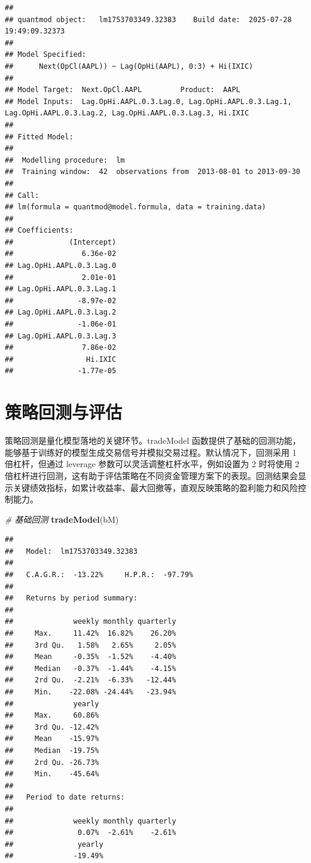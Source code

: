 \documentclass[]{ctexbook}
\newenvironment{Shaded}{\begin{snugshade}}{\end{snugshade}}
\newcommand{\CommentTok}[1]{\textcolor[rgb]{0.56,0.35,0.01}{\textit{#1}}}
\newcommand{\FunctionTok}[1]{\textcolor[rgb]{0.13,0.29,0.53}{\textbf{#1}}}
\newcommand{\NormalTok}[1]{#1}
\begin{document}
\begin{verbatim}
## 
## quantmod object:   lm1753703349.32383    Build date:  2025-07-28 19:49:09.32373 
## 
## Model Specified: 
##      Next(OpCl(AAPL)) ~ Lag(OpHi(AAPL), 0:3) + Hi(IXIC) 
## 
## Model Target:  Next.OpCl.AAPL         Product:  AAPL 
## Model Inputs:  Lag.OpHi.AAPL.0.3.Lag.0, Lag.OpHi.AAPL.0.3.Lag.1, Lag.OpHi.AAPL.0.3.Lag.2, Lag.OpHi.AAPL.0.3.Lag.3, Hi.IXIC 
## 
## Fitted Model: 
## 
##  Modelling procedure:  lm 
##  Training window:  42  observations from  2013-08-01 to 2013-09-30
## 
## Call:
## lm(formula = quantmod@model.formula, data = training.data)
## 
## Coefficients:
##             (Intercept)  
##                6.36e-02  
## Lag.OpHi.AAPL.0.3.Lag.0  
##                2.01e-01  
## Lag.OpHi.AAPL.0.3.Lag.1  
##               -8.97e-02  
## Lag.OpHi.AAPL.0.3.Lag.2  
##               -1.06e-01  
## Lag.OpHi.AAPL.0.3.Lag.3  
##                7.86e-02  
##                 Hi.IXIC  
##               -1.77e-05
\end{verbatim}

\section{策略回测与评估}\label{ux7b56ux7565ux56deux6d4bux4e0eux8bc4ux4f30}

策略回测是量化模型落地的关键环节。tradeModel 函数提供了基础的回测功能，能够基于训练好的模型生成交易信号并模拟交易过程。默认情况下，回测采用 1 倍杠杆，但通过 leverage 参数可以灵活调整杠杆水平，例如设置为 2 时将使用 2 倍杠杆进行回测，这有助于评估策略在不同资金管理方案下的表现。回测结果会显示关键绩效指标，如累计收益率、最大回撤等，直观反映策略的盈利能力和风险控制能力。

\begin{Shaded}
\begin{Highlighting}[]
\CommentTok{\# 基础回测}
\FunctionTok{tradeModel}\NormalTok{(bM)}
\end{Highlighting}
\end{Shaded}

\begin{verbatim}
## 
##   Model:  lm1753703349.32383 
## 
##   C.A.G.R.:  -13.22%     H.P.R.:  -97.79% 
## 
##   Returns by period summary:
## 
##              weekly monthly quarterly
##     Max.     11.42%  16.82%    26.20%
##     3rd Qu.   1.58%   2.65%     2.05%
##     Mean     -0.35%  -1.52%    -4.40%
##     Median   -0.37%  -1.44%    -4.15%
##     2rd Qu.  -2.21%  -6.33%   -12.44%
##     Min.    -22.08% -24.44%   -23.94%
##              yearly
##     Max.     60.86%
##     3rd Qu. -12.42%
##     Mean    -15.97%
##     Median  -19.75%
##     2rd Qu. -26.73%
##     Min.    -45.64%
## 
##   Period to date returns:
## 
##              weekly monthly quarterly
##               0.07%  -2.61%    -2.61%
##               yearly
##              -19.49%
\end{verbatim}
\end{document}

